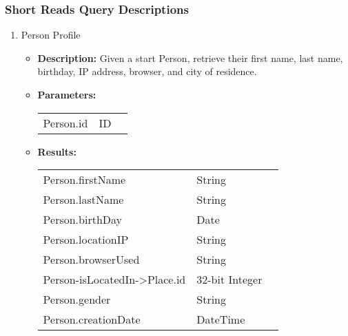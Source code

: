 \subsubsection{Short Reads Query Descriptions}

{\small 
\begin{enumerate}

  \item Person Profile
    \begin{itemize}
      \item \textbf{Description:}
        Given a start Person, retrieve their first name, last name, birthday, IP address, browser, and city of residence.
      \item \textbf{Parameters:} \\
        \begin{tabular}{lll}
          Person.id 										& ID \\
        \end{tabular}
      \item \textbf{Results:} \\
        \begin{tabular}{lll}
          Person.firstName									& String \\
          Person.lastName										& String \\
          Person.birthDay										& Date \\
          Person.locationIP									& String \\
          Person.browserUsed								& String \\
          Person-isLocatedIn->Place.id			& 32-bit Integer \\
          Person.gender									    & String \\
          Person.creationDate						    & DateTime \\
        \end{tabular}
    \end{itemize}


\end{enumerate}}
